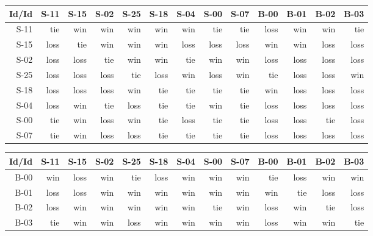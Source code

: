 \begin{tabular}{ | r | r | r | r | r | r | r | r | r | r | r | r | r | }
    \hline
        Id/Id  &   S-11  &   S-15  &   S-02  &   S-25  &   S-18  &   S-04  &   S-00  &   S-07  &   B-00  &   B-01  &   B-02  &   B-03  \\
    \hline
    \hline
         S-11  &    tie  &    win  &    win  &    win  &    win  &    win  &    tie  &    tie  &   loss  &    win  &    win  &    tie  \\
    \hline
         S-15  &   loss  &    tie  &    win  &    win  &    win  &   loss  &   loss  &   loss  &    win  &    win  &   loss  &   loss  \\
    \hline
         S-02  &   loss  &   loss  &    tie  &    win  &    win  &    tie  &    win  &    win  &   loss  &   loss  &   loss  &   loss  \\
    \hline
         S-25  &   loss  &   loss  &   loss  &    tie  &   loss  &    win  &   loss  &    win  &    tie  &   loss  &   loss  &    win  \\
    \hline
         S-18  &   loss  &   loss  &   loss  &    win  &    tie  &    tie  &    tie  &    tie  &    win  &   loss  &   loss  &   loss  \\
    \hline
         S-04  &   loss  &    win  &    tie  &   loss  &    tie  &    tie  &    win  &    tie  &   loss  &   loss  &   loss  &   loss  \\
    \hline
         S-00  &    tie  &    win  &   loss  &    win  &    tie  &   loss  &    tie  &    tie  &   loss  &   loss  &    tie  &   loss  \\
    \hline
         S-07  &    tie  &    win  &   loss  &   loss  &    tie  &    tie  &    tie  &    tie  &   loss  &   loss  &   loss  &   loss  \\
    \hline
\end{tabular}


\begin{tabular}{ | r | r | r | r | r | r | r | r | r | r | r | r | r | }
    \hline
        Id/Id  &   S-11  &   S-15  &   S-02  &   S-25  &   S-18  &   S-04  &   S-00  &   S-07  &   B-00  &   B-01  &   B-02  &   B-03  \\
    \hline
    \hline
         B-00  &    win  &   loss  &    win  &    tie  &   loss  &    win  &    win  &    win  &    tie  &   loss  &    win  &    win  \\
    \hline
         B-01  &   loss  &   loss  &    win  &    win  &    win  &    win  &    win  &    win  &    win  &    tie  &   loss  &   loss  \\
    \hline
         B-02  &   loss  &    win  &    win  &    win  &    win  &    win  &    tie  &    win  &   loss  &    win  &    tie  &   loss  \\
    \hline
         B-03  &    tie  &    win  &    win  &   loss  &    win  &    win  &    win  &    win  &   loss  &    win  &    win  &    tie  \\
    \hline
\end{tabular}


